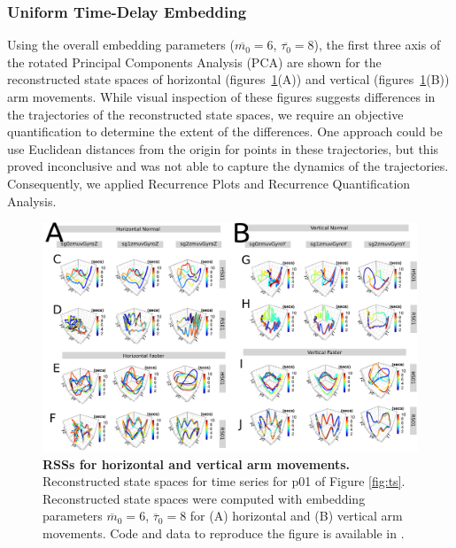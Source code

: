 \documentclass[fleqn,10pt]{wlscirep}
\begin{document}
\subsubsection*{Uniform Time-Delay Embedding}
Using the overall embedding parameters ($\overline{m_0}=6$, $\overline{\tau_0}=8$), 
the first three axis of the rotated Principal Components Analysis (PCA) 
are shown for the reconstructed state spaces of horizontal (figures~\ref{fig:rsss}(A)) 
and vertical (figures~\ref{fig:rsss}(B)) arm movements. 
While visual inspection of these figures 
suggests differences in the trajectories of the reconstructed state spaces, 
we require an objective quantification to determine the extent of the differences.  
One approach could be use Euclidean distances from the origin for points in these 
trajectories, but this proved inconclusive and was not able to capture 
the dynamics of the trajectories. Consequently, we applied 
Recurrence Plots and Recurrence Quantification Analysis.
\begin{figure}[ht]
\centering
\includegraphics[width=1.0\textwidth]{fig-fig3.pdf}
\caption{
	{\bf RSSs for horizontal and vertical arm movements.}
	Reconstructed state spaces for time series for p01 of Figure \ref{fig:ts}.
	Reconstructed state spaces were computed with 
	embedding parameters 
	$\overline{m}_0=6$, $\overline{\tau}_0=8$
	for (A) horizontal and (B) vertical arm movements.
	Code and data to reproduce the figure is available in \cite{srep2020}.	
        }
    \label{fig:rsss}
\end{figure}
\end{document}
